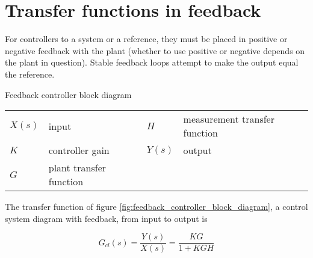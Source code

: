 \section{Transfer functions in feedback}

For \glspl{controller} to  a \gls{system} or
 a reference, they must be placed in positive or
negative feedback with the \gls{plant} (whether to use positive or negative
depends on the \gls{plant} in question). Stable feedback loops attempt to make
the \gls{output} equal the \gls{reference}.

\begin{bookfigure}

  \caption{Feedback controller block diagram}
  \label{fig:feedback_controller_block_diagram}

  \begin{figurekey}
    \begin{tabular}{llll}
      $X(s)$ & input & $H$ & measurement transfer function \\
      $K$ & controller gain & $Y(s)$ & output \\
      $G$ & plant transfer function & & \\
    \end{tabular}
  \end{figurekey}
\end{bookfigure}

The transfer function of figure \ref{fig:feedback_controller_block_diagram}, a
\gls{control system} diagram with feedback, from input to output is

\begin{equation}
  G_{cl}(s) = \frac{Y(s)}{X(s)} = \frac{KG}{1 + KGH}
\end{equation}

